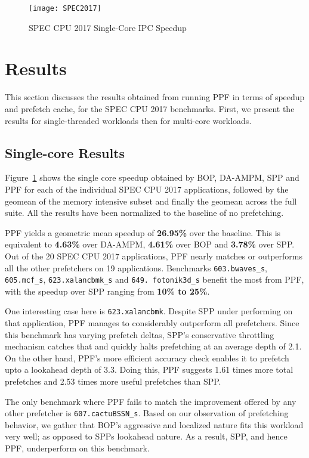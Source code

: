 \begin{figure}[ht]
\texttt{[image: SPEC2017]}
\caption{SPEC CPU 2017 Single-Core IPC Speedup}
\label{Fig:SPEC2017_1core}
\end{figure}

\section{Results}
\label{Results}

This section discusses the results obtained from running PPF in terms
of speedup and prefetch cache, for the SPEC CPU 2017 benchmarks.
First, we present the results for single-threaded workloads then for
multi-core workloads.

\subsection{Single-core Results}
\label{Results-Single}

Figure~\ref{Fig:SPEC2017_1core} shows the single core speedup obtained
by BOP, DA-AMPM, SPP and PPF for each of the individual SPEC CPU 2017
applications, followed by the geomean of the memory intensive subset
and finally the geomean across the full suite.  All the results have
been normalized to the baseline of no prefetching.

PPF yields a geometric mean speedup of \textbf{26.95\%} over the
baseline.  This is equivalent to \textbf{4.63\%} over DA-AMPM,
\textbf{4.61\%} over BOP and \textbf{3.78\%} over SPP.  Out of the 20
SPEC CPU 2017 applications, PPF nearly matches or
outperforms all the other prefetchers on 19 applications.  
Benchmarks {\tt 603.bwaves\_s}, {\tt 605.mcf\_s}, {\tt{623.xalancbmk}\_s} 
and {\tt 649. fotonik3d\_s} benefit the most from PPF, with the 
speedup over SPP ranging from \textbf{10\% to 25\%}.

One interesting
case here is {\tt 623.xalancbmk}.  Despite SPP under performing on that
application, PPF manages to considerably outperform all prefetchers.
Since this benchmark has varying prefetch deltas, SPP's conservative
throttling mechanism catches that and quickly halts prefetching at an
average depth of 2.1.  On the other hand, PPF's more efficient
accuracy check enables it to prefetch upto a lookahead depth of
3.3. Doing this, PPF suggests 1.61 times more total prefetches and
2.53 times more useful prefetches than SPP.

The only benchmark where PPF fails to match the improvement offered by
any other prefetcher is {\tt 607.cactuBSSN\_s}. Based on our observation
of prefetching behavior, we gather that BOP's aggressive and localized
nature fits this workload very well; as opposed to SPPs lookahead
nature.  As a result, SPP, and hence PPF, underperform on this
benchmark.

